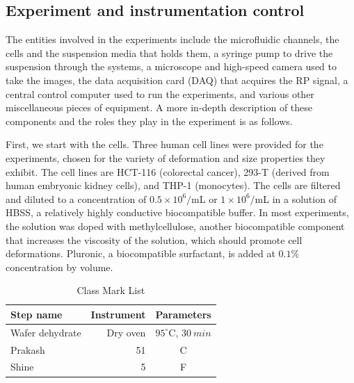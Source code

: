 		\subsection{Experiment and instrumentation control}
		
		The entities involved in the experiments include the microfluidic channels, the cells and the suspension media that holds them, a syringe pump to drive the suspension through the systems, a microscope and high-speed camera used to take the images, the data acquisition card (DAQ) that acquires the RP signal, a central control computer used to run the experiments,  and various other miscellaneous pieces of equipment. A more in-depth description of these components and the roles they play in the experiment is as follows.
		
		First, we start with the cells. Three human cell lines were provided for the experiments, chosen for the variety of deformation and size properties they exhibit. The cell lines are HCT-116 (colorectal cancer), 293-T (derived from human embryonic kidney cells), and THP-1 (monocytes). The cells are filtered and diluted to a concentration of $0.5\times10^{6}/$mL or $1\times10^{6}/$mL in a solution of HBSS, a relatively highly conductive biocompatible buffer. In most experiments, the solution was doped with methylcellulose, another biocompatible component that increases the viscosity of the solution, which should promote cell deformations. Pluronic, a biocompatible surfactant, is added at $0.1\%$ concentration by volume.
		
		\begin{table}
			\begin{center}
			    \begin{tabular}{lrc}\hline
			    Step name & Instrument & Parameters \\
			    \hline
			    Wafer dehydrate & Dry oven & $95^{\circ}$C, $\SI{30}{min}$ \\
			    Prakash & 51 & C\\
			    Shine & 5 & F\\ \hline
			    \end{tabular}
			    \caption{Class Mark List}\label{tab:a}
			\end{center}
		\end{table}
		
		
		
		
		
